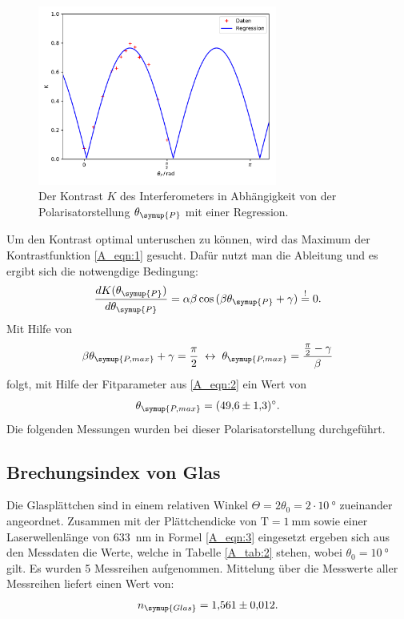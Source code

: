 \documentclass[
  bibliography=totoc,     %
  captions=tableheading,  %
  titlepage=firstiscover, %
]{scrartcl}
\begin{document}
\begin{figure}[H]
  \centering
  \includegraphics[width=0.7\textwidth]{Kontrast.pdf}
  \caption{Der Kontrast $K$ des Interferometers in Abhängigkeit von der Polarisatorstellung
  $\theta_{\symup{P}}$ mit einer Regression.}
  \label{A_abb:1}
\end{figure}
\noindent
Um den Kontrast optimal unteruschen zu können, wird das Maximum der
Kontrastfunktion \eqref{A_eqn:1} gesucht. Dafür nutzt man die Ableitung
und es ergibt sich die notwengdige Bedingung:
\begin{equation*}
  \frac{dK(\theta_{\symup{P}})}{d\theta_{\symup{P}}} = \alpha \beta \cos{
  (\beta \theta_{\symup{P}} + \gamma)} \stackrel{!}{=} 0.
\end{equation*}
Mit Hilfe von
\begin{equation*}
  \beta \theta_{\symup{P, max}} + \gamma = \frac{\pi}{2} \; \leftrightarrow \;
  \theta_{\symup{P, max}} = \frac{\frac{\pi}{2} - \gamma}{\beta}
\end{equation*}
folgt, mit Hilfe der Fitparameter aus \eqref{A_eqn:2} ein Wert von
\begin{equation*}
  \theta_{\symup{P, max}} = \SI{49.6(13)}{\degree}.
\end{equation*}
Die folgenden Messungen wurden bei dieser Polarisatorstellung durchgeführt.

\subsection{Brechungsindex von Glas}
Die Glasplättchen sind in einem relativen Winkel $\Theta = 2 \theta_0 = 2 \cdot \SI{10}{\degree}$
zueinander angeordnet. Zusammen mit der Plättchendicke von $\mathup{T}=\SI{1}{\milli\metre}$
sowie einer Laserwellenlänge von \SI{633}{\nano\metre} in Formel \eqref{A_eqn:3}
eingesetzt ergeben sich aus den Messdaten die Werte, welche in Tabelle \ref{A_tab:2}
stehen, wobei $\theta_0 = \SI{10}{\degree}$ gilt. Es wurden 5 Messreihen
aufgenommen. Mittelung über die Messwerte aller Messreihen liefert einen Wert von:
\begin{equation*}
  n_{\symup{Glas}} = \num{1.561(12)}.
\end{equation*}
\end{document}
